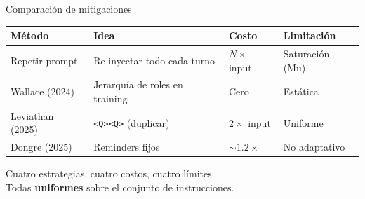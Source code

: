 \documentclass[aspectratio=169, 11pt]{beamer}
\begin{document}
\begin{frame}{Comparaci\'on de mitigaciones}

\renewcommand{\arraystretch}{1.5}
\begin{table}
\centering
\footnotesize
\begin{tabular}{@{} >{\raggedright\arraybackslash}p{2.8cm} >{\raggedright\arraybackslash}p{3.2cm} >{\raggedright\arraybackslash}p{1.9cm} >{\raggedright\arraybackslash}p{3.1cm} @{}}
\toprule
\textbf{M\'etodo} & \textbf{Idea} & \textbf{Costo} & \textbf{Limitaci\'on} \\
\midrule
Repetir prompt & Re-inyectar todo cada turno & $N\times$ input & Saturaci\'on (Mu) \\
Wallace (2024) & Jerarqu\'ia de roles en training & Cero & Est\'atica \\
Leviathan (2025) & \texttt{<Q><Q>} (duplicar) & $2\times$ input & Uniforme \\
Dongre (2025) & Reminders fijos & $\sim 1.2\times$ & No adaptativo \\
\bottomrule
\end{tabular}
\end{table}

\vspace{0.6em}

\begin{center}
\footnotesize
Cuatro estrategias, cuatro costos, cuatro l\'imites.\\
Todas \alert{\textbf{uniformes}} sobre el conjunto de instrucciones.
\end{center}

\end{frame}

\end{document}

